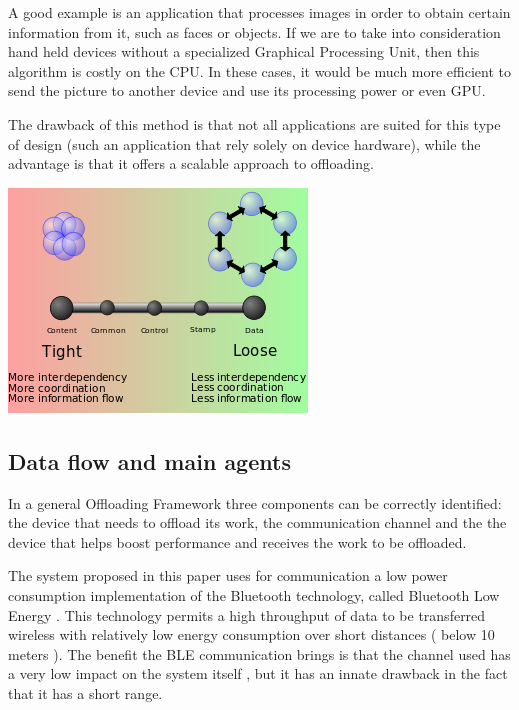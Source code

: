 \documentclass[twoside]{article}
\begin{document}
\begin{multicols}{2}
\begin{enumerate}
A good example is an application that processes images in order to obtain certain information from it, such as faces or objects. If we are to take into consideration hand held devices without a specialized Graphical Processing Unit, then this algorithm is costly on the CPU. In these cases, it would be much more efficient to send the picture to another device and use its processing power or even GPU.

The drawback of this method is that not all applications are suited for this type of design (such an application that rely solely on device hardware), while the advantage is that it offers a scalable approach to offloading.

\end{enumerate}

\begingroup
	\centering
	\includegraphics[scale=0.5]{CoupledLoose.png}
	\label{looseimage}
\endgroup

\subsection{Data flow and main agents}
\label{dataflow}

In a general Offloading Framework three components can be correctly identified: the device that needs to offload its work, the communication channel and the the device that helps boost performance and receives the work to be offloaded.

The system proposed in this paper uses for communication a low power consumption implementation of the Bluetooth technology, called Bluetooth Low Energy \cite{BLE2}. This technology permits a high throughput of data to be transferred wireless with relatively low energy consumption over short distances ( below 10 meters ). The benefit the BLE communication brings is that the channel used has a very low impact on the system itself \cite{BLE}, but it has an innate drawback in the fact that it has a short range.


\end{multicols}
\end{document}
